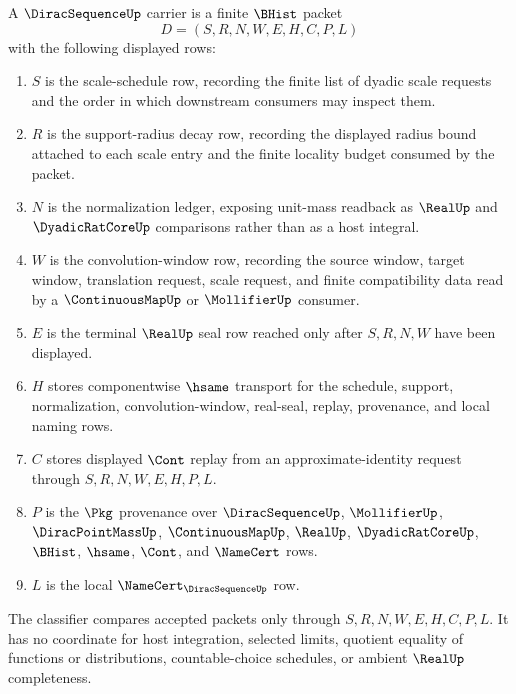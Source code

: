 \begin{definition}
\label{def:dirac-sequence-carrier}
A $\DiracSequenceUp$ carrier is a finite $\BHist$ packet
$$
D=(S,R,N,W,E,H,C,P,L)
$$
with the following displayed rows:
\begin{enumerate}
\item $S$ is the scale-schedule row, recording the finite list of dyadic scale requests and the order in which downstream consumers may inspect them.
\item $R$ is the support-radius decay row, recording the displayed radius bound attached to each scale entry and the finite locality budget consumed by the packet.
\item $N$ is the normalization ledger, exposing unit-mass readback as $\RealUp$ and $\DyadicRatCoreUp$ comparisons rather than as a host integral.
\item $W$ is the convolution-window row, recording the source window, target window, translation request, scale request, and finite compatibility data read by a $\ContinuousMapUp$ or $\MollifierUp$ consumer.
\item $E$ is the terminal $\RealUp$ seal row reached only after $S,R,N,W$ have been displayed.
\item $H$ stores componentwise $\hsame$ transport for the schedule, support, normalization, convolution-window, real-seal, replay, provenance, and local naming rows.
\item $C$ stores displayed $\Cont$ replay from an approximate-identity request through $S,R,N,W,E,H,P,L$.
\item $P$ is the $\Pkg$ provenance over $\DiracSequenceUp$, $\MollifierUp$, $\DiracPointMassUp$, $\ContinuousMapUp$, $\RealUp$, $\DyadicRatCoreUp$, $\BHist$, $\hsame$, $\Cont$, and $\NameCert$ rows.
\item $L$ is the local $\NameCert_{\DiracSequenceUp}$ row.
\end{enumerate}
The classifier compares accepted packets only through $S,R,N,W,E,H,C,P,L$. It has no coordinate for host integration, selected limits, quotient equality of functions or distributions, countable-choice schedules, or ambient $\RealUp$ completeness.
\end{definition}

